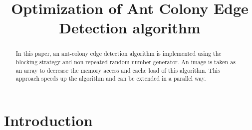 \documentclass[letterpaper]{article}
\title{Optimization of Ant Colony Edge Detection algorithm}
\newcommand{\mypar}[1]{{\bf #1.}}
\begin{document}
%
\maketitle
%


\begin{abstract}
In this paper, an ant-colony edge detection algorithm is implemented using the blocking strategy and non-repeated random number generator. An image is taken as an array to decrease the memory access and cache load of this algorithm. This approach speeds up the algorithm and can be extended in a parallel way.
\end{abstract}

\section{Introduction}\label{sec:intro}

%
%
%
%
\end{document}
